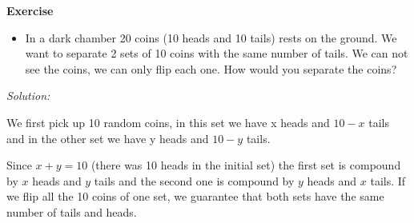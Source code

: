 \documentclass[paper=9in:6in,pagesize=pdftex,headinclude=on,footinclude=on,10pt,bibtotoc,pointlessnumbers,normalheadings,DIV=9,twoside=false]{scrbook}
\begin{document}
\date{}


\begin{large} 
 \textbf{Exercise}
\end{large} 
\begin{itemize} 
\item In a dark chamber 20 coins (10 heads and 10 tails) rests on the ground. We want to separate 2 sets of 10 coins with the same number of tails. We can not see the coins, we can only flip each one. How would you separate the coins?
\end{itemize}

\begin{large}
\textit{Solution:\\}
\end{large}

\begin{text}
We first pick up 10 random coins, in this set we have x heads and $10-x$ tails and in the other set we have y heads and $10-y$ tails. 
\end{text}

\begin{text}
Since $x+y=10$ (there was 10 heads in the initial set) the first set is compound by $x$ heads and $y$ tails and the second one is compound by $y$ heads and $x$ tails. If we flip all the 10 coins of one set, we guarantee that both sets have the same number of tails and heads.

\end{text}
\end{document}
